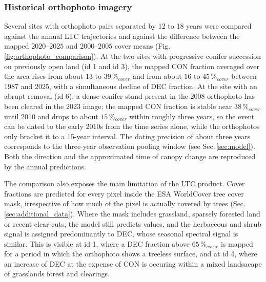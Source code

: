 \documentclass[essd, manuscript]{copernicus}
\begin{document}
\subsubsection{Historical orthophoto imagery}
\label{sec:orthophoto}

Several sites with orthophoto pairs separated by 12 to 18 years were compared against the annual LTC trajectories and against the difference between the mapped $2020$--$2025$ and $2000$--$2005$ cover means (Fig.\,\ref{fig:orthophoto_comparison}).%
At the two sites with progressive conifer succession on previously open land (id 1 and id 3), the mapped CON fraction averaged over the area rises from about $13$ to $39\,\%_{cover}$ and from about $16$ to $45\,\%_{cover}$ between 1987 and 2025, with a simultaneous decline of DEC fraction. At the site with an abrupt removal (id 6), a dense conifer stand present in the 2008 orthophoto has been cleared in the 2023 image; the mapped CON fraction is stable near $38\,\%_{cover}$ until 2010 and drops to about $15\,\%_{cover}$ within roughly three years, so the event can be dated to the early 2010s from the time series alone, while the orthophotos only bracket it to a 15-year interval. The dating precision of about three years corresponds to the three-year observation pooling window (see Sec.\,\ref{sec:model}). Both the direction and the approximated time of canopy change are reproduced by the annual predictions.

The comparison also exposes the main limitation of the LTC product. Cover fractions are predicted for every pixel inside the ESA WorldCover tree cover mask, irrespective of how much of the pixel is actually covered by trees (Sec.\,\ref{sec:additional_data}). Where the mask includes grassland, sparsely forested land or recent clear-cuts, the model still predicts values, and the herbaceous and shrub signal is assigned predominantly to DEC, whose seasonal spectral signal is similar. This is visible at id 1, where a DEC fraction above $65\,\%_{cover}$ is mapped for a period in which the orthophoto shows a treeless surface, and at id 4, where an increase of DEC at the expense of CON is occuring within a mixed landsacape of grasslands forest and clearings.%
\end{document}
